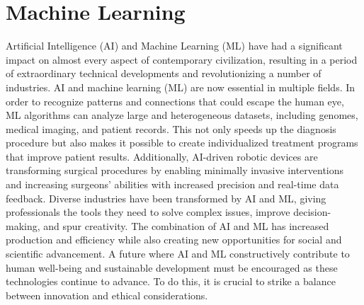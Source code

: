 \documentclass[a4paper,11pt]{report}%
\renewcommand{\\}{\vspace*{0.5\baselineskip} \newline}
\begin{document}
\section{Machine Learning}
Artificial Intelligence (AI) and Machine Learning (ML) have had a significant impact on almost every aspect of contemporary civilization, resulting in a period of extraordinary technical developments and revolutionizing a number of industries. AI and machine learning (ML) are now essential in multiple fields. In order to recognize patterns and connections that could escape the human eye, ML algorithms can analyze large and heterogeneous datasets, including genomes, medical imaging, and patient records. This not only speeds up the diagnosis procedure but also makes it possible to create individualized treatment programs that improve patient results. Additionally, AI-driven robotic devices are transforming surgical procedures by enabling minimally invasive interventions and increasing surgeons' abilities with increased precision and real-time data feedback.
Diverse industries have been transformed by AI and ML, giving professionals the tools they need to solve complex issues, improve decision-making, and spur creativity. The combination of AI and ML has increased production and efficiency while also creating new opportunities for social and scientific advancement. A future where AI and ML constructively contribute to human well-being and sustainable development must be encouraged as these technologies continue to advance. To do this, it is crucial to strike a balance between innovation and ethical considerations.
\end{document}
